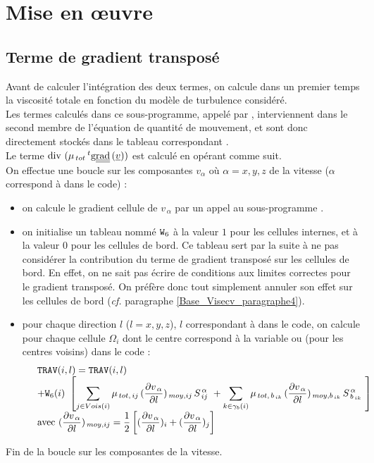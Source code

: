 \section*{Mise en \oe uvre}
\subsection*{Terme de gradient transposé}
Avant de calculer l'intégration des deux termes, on calcule dans un premier
temps la viscosité totale en fonction du modèle de turbulence considéré.\\
Les termes calculés dans ce sous-programme, appelé par , interviennent dans le second membre
de l'équation de quantité de mouvement, et sont donc directement stockés dans le
tableau correspondant  .\\
Le terme $\text{div}\,\,(\mu_{\,tot}\,^t\text{g}\underline{\underline{{\text{rad}}}}\,(\underline{v}))$ est calculé en
opérant comme suit.\\
On effectue une boucle sur les composantes $v_\alpha$ où $\alpha=x,y,z$ de la
vitesse ($\alpha$ correspond à  dans le code) :
\begin{itemize}
\item on calcule le gradient cellule de $v_{\,\alpha}$ par un appel au
sous-programme .
\item on initialise un tableau nommé $\text{\texttt{W}}_6$ à la valeur $1$ pour les cellules
internes, et à la valeur $0$ pour les cellules de bord. Ce tableau sert par la suite à ne
pas considérer la contribution du terme de gradient transposé sur les cellules
de bord. En effet, on ne sait pas \'ecrire de conditions aux limites correctes
pour le gradient transpos\'e. On pr\'ef\`ere donc tout simplement annuler son
effet sur les cellules de bord (\emph{cf.} paragraphe \ref{Base_Visecv_paragraphe4}).
\item pour chaque direction $l$ ($l=x,y,z$), $l$ correspondant à 
dans le code, on calcule pour chaque cellule $\Omega_i$ dont le centre
correspond à la variable  ou
 (pour les centres voisins) dans le code :\\
\begin{equation}\notag
\begin{array}{ll}
&\text{\texttt{TRAV}}(i,l)=\text{\texttt{TRAV}}(i,l)\\
&+\text{\texttt{W}}_6(i)\ \left[\displaystyle \sum\limits_{j \in
Vois(i)} \mu_{\,tot,\,ij}\,(\frac {\partial v_{\,\alpha}}{\partial l}
)_{\,moy,ij}\,S_{\,ij}^{\,\alpha}\  +  \displaystyle \sum_{k \in
\gamma_b(i)} \mu_{\,tot,\, {b_{\,ik}}}\,(\frac {\partial v_{\,\alpha}}{\partial
l})_{\,moy,{b_{\,ik}}}\,S_{\,{b_{\,ik}}}^{\,\alpha}\ \right]\\
&\displaystyle\text{avec }
(\frac{\partial v_{\,\alpha}}{\partial l})_{\,moy,ij}=\frac{1}{2}\left[
(\frac{\partial v_{\,\alpha}}{\partial l})_i
+(\frac{\partial v_{\,\alpha}}{\partial l})_j\right]
\end{array}
\end{equation}
\end{itemize}
Fin de la boucle sur les composantes de la vitesse.\\
\\

